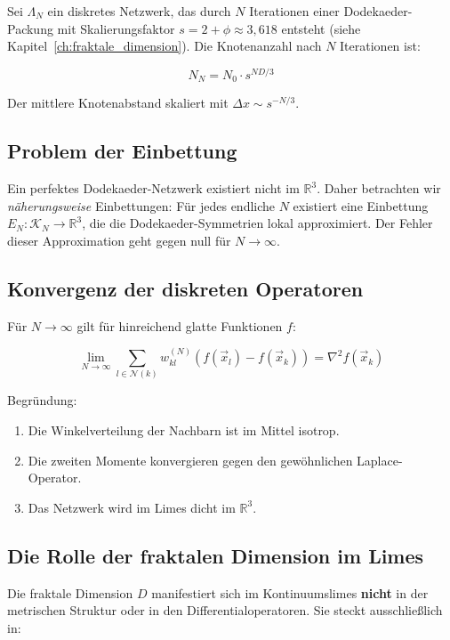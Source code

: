 Sei \( \Lambda_N \) ein diskretes Netzwerk, das durch \( N \) Iterationen einer Dodekaeder-Packung mit Skalierungsfaktor \( s = 2 + \phi \approx 3,618 \) entsteht (siehe Kapitel~\ref{ch:fraktale_dimension}). Die Knotenanzahl nach \( N \) Iterationen ist:

\[
N_N = N_0 \cdot s^{ND/3}
\]

Der mittlere Knotenabstand skaliert mit \( \Delta x \sim s^{-N/3} \).

\subsection{Problem der Einbettung}
\label{sub:kontinuumslimes_einbettung}

Ein perfektes Dodekaeder-Netzwerk existiert nicht im \( \mathbb{R}^3 \). Daher betrachten wir \emph{näherungsweise} Einbettungen: Für jedes endliche \( N \) existiert eine Einbettung \( E_N: \mathcal{K}_N \to \mathbb{R}^3 \), die die Dodekaeder-Symmetrien lokal approximiert. Der Fehler dieser Approximation geht gegen null für \( N \to \infty \).

\subsection{Konvergenz der diskreten Operatoren}
\label{sub:kontinuumslimes_operatoren_konvergenz}

Für \( N \to \infty \) gilt für hinreichend glatte Funktionen \( f \):

\[
\lim_{N \to \infty} \sum_{l \in \mathcal{N}(k)} w_{kl}^{(N)} (f(\vec{x}_l) - f(\vec{x}_k)) = \nabla^2 f(\vec{x}_k)
\]

Begründung:
\begin{enumerate}
    \item Die Winkelverteilung der Nachbarn ist im Mittel isotrop.
    \item Die zweiten Momente konvergieren gegen den gewöhnlichen Laplace-Operator.
    \item Das Netzwerk wird im Limes dicht im \( \mathbb{R}^3 \).
\end{enumerate}

\subsection{Die Rolle der fraktalen Dimension im Limes}
\label{sub:kontinuumslimes_fraktale_rolle}

Die fraktale Dimension \( D \) manifestiert sich im Kontinuumslimes \textbf{nicht} in der metrischen Struktur oder in den Differentialoperatoren. Sie steckt ausschließlich in:

